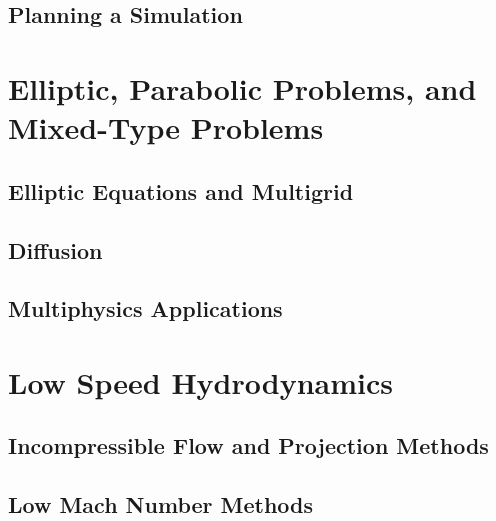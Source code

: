 \documentclass[11pt]{book}
\begin{document}
\fi

\chapter{Planning a Simulation}






\part{Elliptic, Parabolic Problems, and Mixed-Type Problems}

\chapter{Elliptic Equations and Multigrid}



\chapter{Diffusion}



\chapter{Multiphysics Applications}




\part{Low Speed Hydrodynamics}

\chapter{Incompressible Flow and Projection Methods}



\chapter{Low Mach Number Methods}


\end{document}
